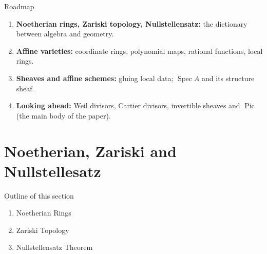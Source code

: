 \documentclass[8pt]{beamer}
\DeclareMathOperator{\Spec}{Spec}
\DeclareMathOperator{\Pic}{Pic}
\theoremstyle{definition}
\begin{document}
    \begin{frame}{Roadmap}
        \begin{enumerate}
            \item \textbf{Noetherian rings, Zariski topology, Nullstellensatz:} the dictionary between algebra and geometry.
            \item \textbf{Affine varieties:} coordinate rings, polynomial maps, rational functions, local rings.
            \item \textbf{Sheaves and affine schemes:} gluing local data; $\Spec A$ and its structure sheaf.
            \item \textbf{Looking ahead:} Weil divisors, Cartier divisors, invertible sheaves and $\Pic$ (the main body of the paper).
        \end{enumerate}
    \end{frame}

    \section{Noetherian, Zariski and Nullstellesatz}

    \begin{frame}{Outline of this section}
        \begin{enumerate}
            \item Noetherian Rings
            \item Zariski Topology
            \item Nullstellensatz Theorem
        \end{enumerate}
        
    \end{frame}
\end{document}
